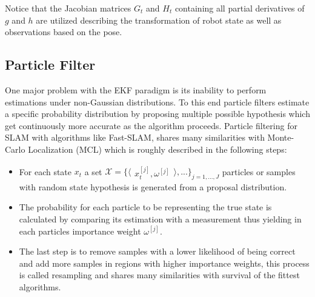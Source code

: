 Notice that the Jacobian matrices $G_{t}$ and $H_{t}$ containing all partial derivatives of $g$ and $h$ are utilized describing the transformation of robot state as well as observations based on the pose.




\subsection{Particle Filter}
One major problem with the EKF paradigm is its inability to perform estimations under non-Gaussian distributions. 
To this end particle filters estimate a specific probability distribution by proposing multiple possible hypothesis which get continuously more accurate as the algorithm proceeds. 
Particle filtering for SLAM with algorithms like Fast-SLAM, shares many similarities with Monte-Carlo Localization (MCL) which is roughly described in the following steps:
\begin{itemize}
	\item For each state $ x_{t} $ a set 
	$
	\mathcal{X} = 
	\{ 
	\langle
	\begin{matrix}
		 x_{t}^{[j]},  \omega^{[j]}
	\end{matrix}
	\rangle
	, ...
	\}
	_{j=1, ..., J}
	$
	particles or samples 
	with random state hypothesis is generated from a proposal distribution. 
	\item The probability for each particle to be representing the true state is calculated by comparing its estimation with a measurement thus yielding in each particles importance weight $ \omega^{[j]} $.
	\item The last step is to remove samples with a lower likelihood of being correct and add more samples in regions with higher importance weights, this process is called resampling and shares many similarities with survival of the fittest algorithms.
\end{itemize}

